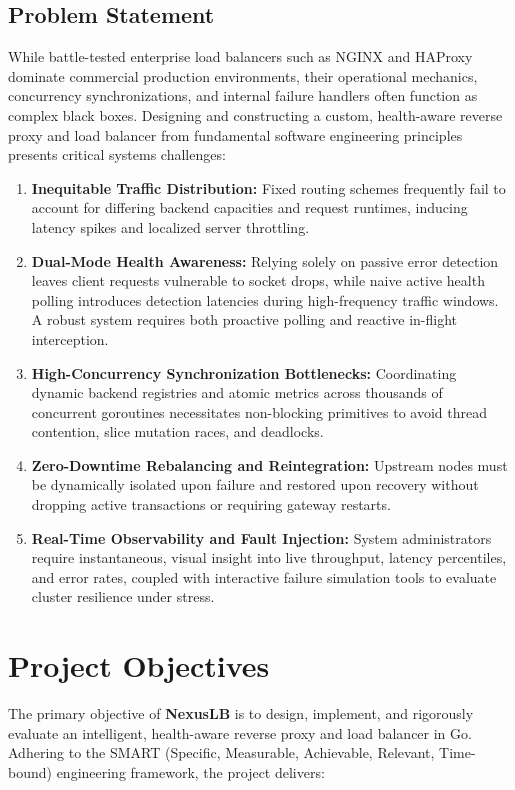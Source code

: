 \documentclass[12pt,openany]{report}
\begin{document}
\subsection{Problem Statement}

While battle-tested enterprise load balancers such as NGINX and HAProxy dominate commercial production environments, their operational mechanics, concurrency synchronizations, and internal failure handlers often function as complex black boxes. Designing and constructing a custom, health-aware reverse proxy and load balancer from fundamental software engineering principles presents critical systems challenges:

\begin{enumerate}
  \item \textbf{Inequitable Traffic Distribution:} Fixed routing schemes frequently fail to account for differing backend capacities and request runtimes, inducing latency spikes and localized server throttling.
  \item \textbf{Dual-Mode Health Awareness:} Relying solely on passive error detection leaves client requests vulnerable to socket drops, while naive active health polling introduces detection latencies during high-frequency traffic windows. A robust system requires both proactive polling and reactive in-flight interception.
  \item \textbf{High-Concurrency Synchronization Bottlenecks:} Coordinating dynamic backend registries and atomic metrics across thousands of concurrent goroutines necessitates non-blocking primitives to avoid thread contention, slice mutation races, and deadlocks.
  \item \textbf{Zero-Downtime Rebalancing and Reintegration:} Upstream nodes must be dynamically isolated upon failure and restored upon recovery without dropping active transactions or requiring gateway restarts.
  \item \textbf{Real-Time Observability and Fault Injection:} System administrators require instantaneous, visual insight into live throughput, latency percentiles, and error rates, coupled with interactive failure simulation tools to evaluate cluster resilience under stress.
\end{enumerate}

\section{Project Objectives}

The primary objective of \textbf{NexusLB} is to design, implement, and rigorously evaluate an intelligent, health-aware reverse proxy and load balancer in Go. Adhering to the SMART (Specific, Measurable, Achievable, Relevant, Time-bound) engineering framework, the project delivers:
\end{document}
